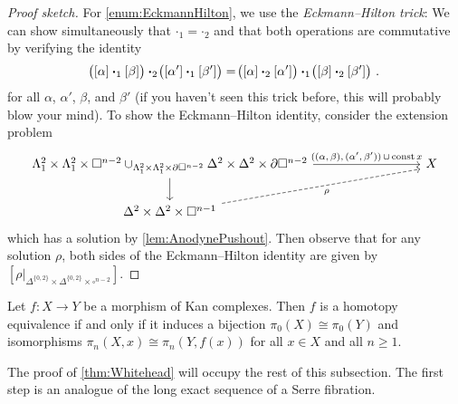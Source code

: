\begin{proof}[Proof sketch]
	For \cref{enum:EckmannHilton}, we use the \emph{Eckmann--Hilton trick}: We can show simultaneously that $\boldsymbol{\cdot}_1=\boldsymbol{\cdot}_2$ and that both operations are commutative by verifying the identity
	\begin{equation*}
		\lef([\alpha]\boldsymbol{\cdot}_1[\beta]\righ)\boldsymbol{\cdot}_2\lef([\alpha']\boldsymbol{\cdot}_1[\beta']\righ)=\lef([\alpha]\boldsymbol{\cdot}_2[\alpha']\righ)\boldsymbol{\cdot}_1\lef([\beta]\boldsymbol{\cdot}_2[\beta']\righ)\,.
	\end{equation*}
	for all $\alpha$, $\alpha'$, $\beta$, and $\beta'$ (if you haven't seen this trick before, this will probably blow your mind). To show the Eckmann--Hilton identity, consider the extension problem
	\begin{equation*}
		\begin{tikzcd}[column sep=8.5em]
			\Lambda_1^2\times\Lambda_1^2\times\square^{n-2}\cup_{\Lambda_1^2\times\Lambda_1^2\times\partial\square^{n-2}}\Delta^2\times\Delta^2\times\partial\square^{n-2}\dar\rar["{((\alpha,\,\beta),\,(\alpha',\,\beta'))}\,\cup\,{\const x}"] & X\\
			\Delta^2\times\Delta^2\times\square^{n-1}\urar[dashed,"\rho"',end anchor=202]
		\end{tikzcd}
	\end{equation*}
	which has a solution by \cref{lem:AnodynePushout}. Then observe that for any solution $\rho$, both sides of the Eckmann--Hilton identity are given by $[\rho|_{\Delta^{\{0,2\}}\times \Delta^{\{0,2\}}\times\square^{n-2}}]$.
\end{proof}
\begin{thm}\label{thm:Whitehead}
	Let $f\colon X\rightarrow Y$ be a morphism of Kan complexes. Then $f$ is a homotopy equivalence if and only if it induces a bijection $\pi_0(X)\cong \pi_0(Y)$ and isomorphisms $\pi_n(X,x)\cong \pi_n(Y,f(x))$ for all $x\in X$ and all $n\geqslant 1$.
\end{thm}
The proof of \cref{thm:Whitehead} will occupy the rest of this subsection. The first step is an analogue of the long exact sequence of a Serre fibration.
